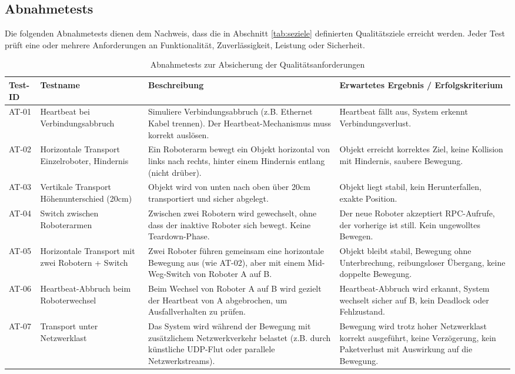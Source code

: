 \subsection{Abnahmetests}

Die folgenden Abnahmetests dienen dem Nachweis, dass die in Abschnitt \ref{tab:seziele} definierten Qualitätsziele erreicht werden. Jeder Test prüft eine oder mehrere Anforderungen an Funktionalität, Zuverlässigkeit, Leistung oder Sicherheit.

\begin{table}[h!]
\centering
\begin{tabular}{p{1.6cm}|p{4cm}|p{5.5cm}|p{5.5cm}}
\hline
\textbf{Test-ID} & \textbf{Testname} & \textbf{Beschreibung} & \textbf{Erwartetes Ergebnis / Erfolgskriterium} \\
\hline
AT-01 & Heartbeat bei Verbindungsabbruch & Simuliere Verbindungsabbruch (z.B. Ethernet Kabel trennen). Der Heartbeat-Mechanismus muss korrekt auslösen. & Heartbeat fällt aus, System erkennt Verbindungsverlust.\\
\hline
AT-02 & Horizontale Transport Einzelroboter, Hindernis & Ein Roboterarm bewegt ein Objekt horizontal von links nach rechts, hinter einem Hindernis entlang (nicht drüber). & Objekt erreicht korrektes Ziel, keine Kollision mit Hindernis, saubere Bewegung. \\
\hline
AT-03 & Vertikale Transport  Höhenunterschied (20cm) & Objekt wird von unten nach oben über 20cm transportiert und sicher abgelegt. & Objekt liegt stabil, kein Herunterfallen, exakte Position. \\
\hline
AT-04 & Switch zwischen Roboterarmen & Zwischen zwei Robotern wird gewechselt, ohne dass der inaktive Roboter sich bewegt. Keine Teardown-Phase. & Der neue Roboter akzeptiert RPC-Aufrufe, der vorherige ist still. Kein ungewolltes Bewegen. \\
\hline
AT-05 & Horizontale Transport mit zwei Robotern + Switch & Zwei Roboter führen gemeinsam eine horizontale Bewegung aus (wie AT-02), aber mit einem Mid-Weg-Switch von Roboter A auf B. & Objekt bleibt stabil, Bewegung ohne Unterbrechung, reibungsloser Übergang, keine doppelte Bewegung. \\
\hline
AT-06 & Heartbeat-Abbruch beim Roboterwechsel & Beim Wechsel von Roboter A auf B wird gezielt der Heartbeat von A abgebrochen, um Ausfallverhalten zu prüfen. & Heartbeat-Abbruch wird erkannt, System wechselt sicher auf B, kein Deadlock oder Fehlzustand. \\
\hline
AT-07 & Transport unter Netzwerklast & Das System wird während der Bewegung mit zusätzlichem Netzwerkverkehr belastet (z.B. durch künstliche UDP-Flut oder parallele Netzwerkstreams). & Bewegung wird trotz hoher Netzwerklast korrekt ausgeführt, keine Verzögerung, kein Paketverlust mit Auswirkung auf die Bewegung. \\
\hline
\end{tabular}
\caption{Abnahmetests zur Absicherung der Qualitätsanforderungen}
\label{tab:abnahmetests}
\end{table}
